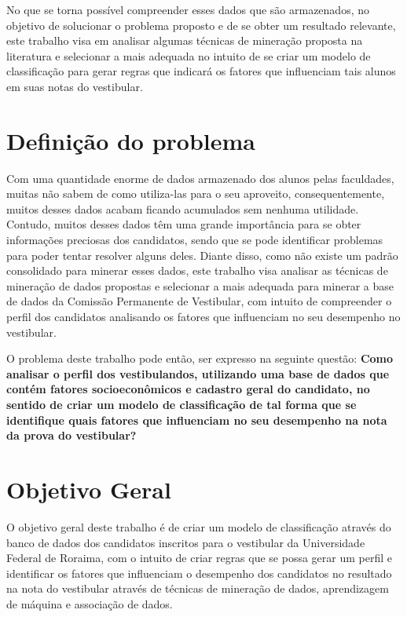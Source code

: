 No que se torna possível compreender esses dados que são armazenados, no objetivo de solucionar o problema proposto e de se obter um resultado relevante, este trabalho visa em analisar algumas técnicas de mineração proposta na literatura e selecionar a mais adequada no intuito de se criar um modelo de classificação para gerar regras que indicará os fatores que influenciam tais alunos em suas notas do vestibular.


\section{Definição do problema}

\par
Com uma quantidade enorme de dados armazenado dos alunos pelas faculdades, muitas não sabem de como utiliza-las para o seu aproveito, consequentemente, muitos desses dados acabam ficando acumulados sem nenhuma utilidade. Contudo, muitos desses dados têm uma grande importância para se obter informações preciosas dos candidatos, sendo que se pode identificar problemas para poder tentar resolver alguns deles. Diante disso, como não existe um padrão consolidado para minerar esses dados, este trabalho visa analisar as técnicas de mineração de dados propostas e selecionar a mais adequada para minerar a base de dados da Comissão Permanente de Vestibular, com intuito de compreender o perfil dos candidatos analisando os fatores que influenciam no seu desempenho no vestibular.

\par
O problema deste trabalho pode então, ser expresso na seguinte questão: \textbf{Como analisar o perfil dos vestibulandos, utilizando uma base de dados que contém fatores socioeconômicos e cadastro geral do candidato, no sentido de criar um modelo de classificação de tal forma que se identifique quais fatores que influenciam no seu desempenho na nota  da prova do vestibular? }



\section{Objetivo Geral}

O objetivo geral deste trabalho é de criar um modelo de classificação através do banco de dados dos candidatos inscritos para o vestibular da Universidade Federal de Roraima, com o intuito de criar regras que se possa gerar um perfil e identificar os fatores que influenciam o desempenho dos candidatos no resultado na nota do vestibular através de técnicas de mineração de dados, aprendizagem de máquina e associação de dados.


